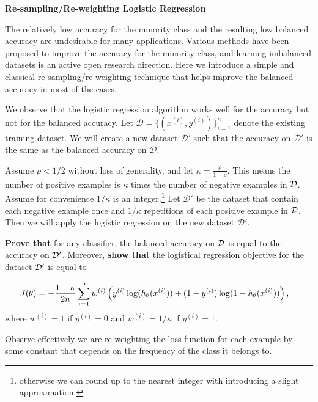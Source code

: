 \item {} \textbf{Re-sampling/Re-weighting Logistic Regression}

The relatively low accuracy for the minority class and the resulting low balanced accuracy are undesirable for many applications. Various methods have been proposed to improve the accuracy for the minority class, and learning imbalanced datasets is  an active open research direction. Here we introduce a simple and classical re-sampling/re-weighting technique that helps improve the balanced accuracy in most of the cases. 

We observe that the logistic regression algorithm works well for the accuracy but not for the balanced accuracy. Let $\mathcal{D} = \{(x^{(i)}, y^{(i)})\}_{i=1}^n$ denote the existing training dataset. We will create a new dataset $\mathcal{D}'$ such that the accuracy on $\mathcal{D}'$ is the same as the balanced accuracy on $\mathcal{D}$.

Assume $\rho < 1/2$ without loss of generality, and let $\kappa = \frac{\rho}{1-\rho}$. This means the number of positive examples is $\kappa$ times the number of negative examples in $\mathcal{D}$. Assume for convenience $1/\kappa$ is an integer.\footnote{otherwise we can round up to the nearest integer with introducing a slight approximation.} Let $\mathcal{D}'$ be the dataset that contain each negative example once and $1/\kappa$ repetitions of each positive example in $\mathcal{D}$. Then we will apply the logistic regression on the new dataset $\mathcal{D}'$.  

{\bf Prove that} for any classifier, the balanced accuracy on $\mathcal{D}$ is equal to the accuracy on $\mathcal{D}'$. Moreover, {\bf show that} the logistical regression objective for the dataset $\mathcal{D}'$ is equal to 


\begin{align*}
J(\theta) &= -\frac{1+\kappa}{2n} \sum_{i=1}^{n} w^{(i)} \left(y^{(i)}\log(h_{\theta}(x^{(i)}))
+  (1 - y^{(i)})\log(1 - h_{\theta}(x^{(i)}))\right),
\end{align*}
where $w^{(i)} = 1$ if $y^{(i)} =0$ and $w^{(i)} = 1/\kappa$ if $y^{(i)} = 1$.


Observe effectively we are re-weighting the loss function for each example by some constant that depends on the frequency of the class it belongs to.


